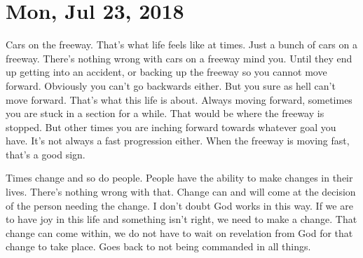 \section{Mon, Jul 23, 2018}

Cars on the freeway. That's what life feels like at times. Just a bunch of cars on a
freeway. There's nothing wrong with cars on a freeway mind you. Until they end up
getting into an accident, or backing up the freeway so you cannot move forward.
Obviously you can't go backwards either. But you sure as hell can't move forward.
That's what this life is about. Always  moving forward, sometimes you are stuck in a
section for a while. That would be where the freeway is stopped. But other times you
are inching forward towards whatever goal you have. It's not always a fast
progression either. When the freeway is moving fast, that's a good sign.

Times change and so do people. People have the ability to make changes in their
lives. There's nothing wrong with that. Change can and will come at the decision of
the person needing the change. I don't doubt God works in this way. If we are to have
joy in this life and something isn't right, we need to make a change. That change can
come within, we do not have to wait on revelation from God for that change to take
place. Goes back to not being commanded in all things.